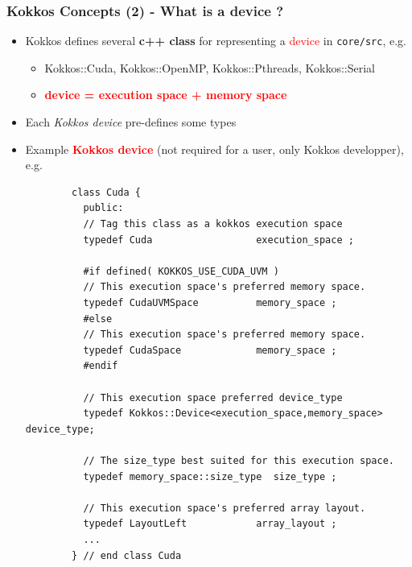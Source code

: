 \begin{frame}[fragile=singleslide]
  \frametitle{Kokkos Concepts (2) - What is a device ?}

  \begin{itemize}
  \item Kokkos defines several {\bf c++ class} for representing a \textcolor{red}{device} in \texttt{core/src}, e.g.
    \begin{itemize}
    \item Kokkos::Cuda, Kokkos::OpenMP, Kokkos::Pthreads, Kokkos::Serial
    \item \textcolor{red}{\bf device = execution space + memory space}
    \end{itemize}
  \item Each \textit{Kokkos device} pre-defines some types
  \item Example \textcolor{red}{\textbf{Kokkos device}} (not required for a user, only Kokkos developper), e.g.\\
    {\tiny
      \begin{verbatim}
        class Cuda {
          public:
          // Tag this class as a kokkos execution space
          typedef Cuda                  execution_space ;
          
          #if defined( KOKKOS_USE_CUDA_UVM )
          // This execution space's preferred memory space.
          typedef CudaUVMSpace          memory_space ;
          #else
          // This execution space's preferred memory space.
          typedef CudaSpace             memory_space ;
          #endif
          
          // This execution space preferred device_type
          typedef Kokkos::Device<execution_space,memory_space> device_type;
          
          // The size_type best suited for this execution space.
          typedef memory_space::size_type  size_type ;
          
          // This execution space's preferred array layout.
          typedef LayoutLeft            array_layout ;
          ...
        } // end class Cuda
        \end{verbatim}
      }
  \end{itemize}

\end{frame}

